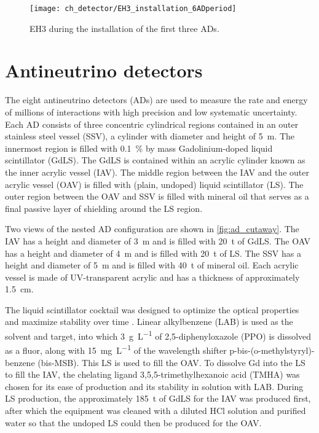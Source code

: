 \begin{figure}
    \centering
    \texttt{[image: ch\_detector/EH3\_installation\_6ADperiod]}
    \caption{EH3 during the installation of the first three ADs.}
    \label{fig:eh3_wp_photo}
\end{figure}

\section{Antineutrino detectors}

The eight antineutrino detectors (ADs) are used to measure
the rate and energy of millions of \nuebar{} interactions with high precision
and low systematic uncertainty.
Each AD consists of three concentric cylindrical regions
contained in an outer stainless steel vessel (SSV),
a cylinder with diameter and height of \SI{5}{\m}.
The innermost region is filled with \SI{0.1}{\percent} by mass
Gadolinium-doped liquid scintillator (GdLS).
The GdLS is contained within an acrylic cylinder known as the inner acrylic vessel (IAV).
The middle region between the IAV and the outer acrylic vessel (OAV) is filled
with (plain, undoped) liquid scintillator (LS).
The outer region between the OAV and SSV is filled with mineral oil
that serves as a final passive layer of shielding around the LS region.

Two views of the nested AD configuration are shown in \cref{fig:ad_cutaway}.
The IAV has a height and diameter of \SI{3}{\m} and is filled with \SI{20}{\tonne}
of GdLS.
The OAV has a height and diameter of \SI{4}{\m} and is filled with \SI{20}{\tonne}
of LS.
The SSV has a height and diameter of \SI{5}{\m} and is filled with \SI{40}{\tonne}
of mineral oil.
Each acrylic vessel is made of UV-transparent acrylic
and has a thickness of approximately \SI{1.5}{\cm}.

The liquid scintillator cocktail was designed to optimize the optical properties
and maximize stability over time \cite{gdls2014}.
Linear alkylbenzene (LAB) is used as the solvent and \nuebar{} target,
into which \SI{3}{\g\per\liter} of 2,5-diphenyloxazole (PPO)
is dissolved as a fluor,
along with \SI{15}{\mg\per\liter} of the wavelength shifter
p-bis-(o-methylstyryl)-benzene (bis-MSB).
This LS is used to fill the OAV.
To dissolve Gd into the LS to fill the IAV, the chelating ligand
3,5,5-trimethylhexanoic acid (TMHA) was chosen for its ease of production
and its stability in solution with LAB.
During LS production, the approximately \SI{185}{\tonne} of GdLS for the IAV
was produced first,
after which the equipment was cleaned with a diluted HCl solution and purified water
so that the undoped LS could then be produced for the OAV.

